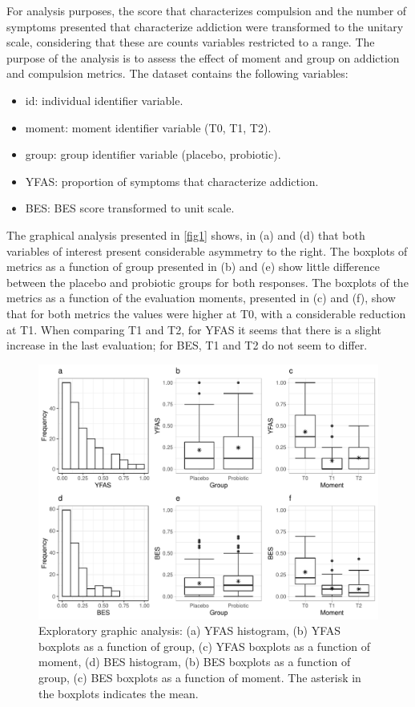 \documentclass[AMA,STIX1COL]{WileyNJD-v2}
\begin{document}

For analysis purposes, the score that characterizes compulsion and the number of symptoms presented that characterize addiction were transformed to the unitary scale, considering that these are counts variables restricted to a range. The purpose of the analysis is to assess the effect of moment and group on addiction and compulsion metrics. The dataset contains the following variables:

\begin{itemize}
  \item id: individual identifier variable.
  \item moment: moment identifier variable (T0, T1, T2).
  \item group: group identifier variable (placebo, probiotic).
  \item YFAS: proportion of symptoms that characterize addiction.
  \item BES: BES score transformed to unit scale.
\end{itemize}


The graphical analysis presented in \autoref{fig1} shows, in (a) and (d) that both variables of interest present considerable asymmetry to the right. The boxplots of metrics as a function of group presented in (b) and (e) show little difference between the placebo and probiotic groups for both responses. The boxplots of the metrics as a function of the evaluation moments, presented in (c) and (f), show that for both metrics the values were higher at T0, with a considerable reduction at T1. When comparing T1 and T2, for YFAS it seems that there is a slight increase in the last evaluation; for BES, T1 and T2 do not seem to differ.  

\begin{figure}[h]
\centerline{\includegraphics[scale = 0.9]{FIGURE1}}
\caption{Exploratory graphic analysis: (a) YFAS histogram, (b) YFAS boxplots as a function of group, (c) YFAS boxplots as a function of moment, (d) BES histogram, (b) BES boxplots as a function of group, (c) BES boxplots as a function of moment. The asterisk in the boxplots indicates the mean.\label{fig1}}
\end{figure}
\end{document}
